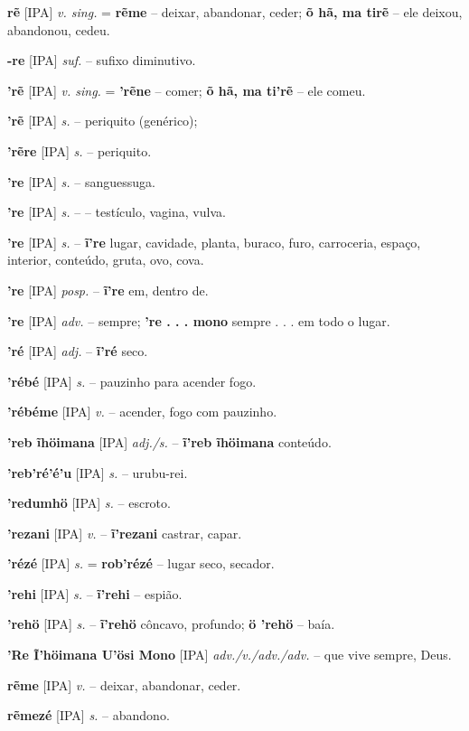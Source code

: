 \textbf{rẽ} [IPA] \textit{v. sing.} = \textbf{rẽme} -- deixar, abandonar, ceder; \textbf{õ hã, ma tirẽ} -- ele deixou, abandonou, cedeu.

\textbf{-re} [IPA] \textit{suf.} -- sufixo diminutivo.

\textbf{'rẽ} [IPA] \textit{v. sing.} = \textbf{'rẽne} -- comer; \textbf{õ hã, ma ti'rẽ} -- ele comeu.

\textbf{'rẽ} [IPA] \textit{s.} -- periquito (genérico); 

\textbf{'rẽre} [IPA] \textit{s.} -- periquito.

\textbf{'re} [IPA] \textit{s.} -- sanguessuga.

\textbf{'re} [IPA] \textit{s.} -- -- testículo, vagina, vulva.

\textbf{'re} [IPA] \textit{s.} -- \textbf{ĩ're} lugar, cavidade, planta, buraco, furo, carroceria, espaço, interior, conteúdo, gruta, ovo, cova.

\textbf{'re} [IPA] \textit{ posp.} -- \textbf{ĩ're} em, dentro de.

\textbf{'re} [IPA] \textit{adv.} -- sempre; \textbf{'re . . . mono} sempre . . . em todo o lugar.

\textbf{'ré} [IPA] \textit{adj.} -- \textbf{ĩ'ré} seco.

\textbf{'rébé} [IPA] \textit{s.} -- pauzinho para acender fogo.

\textbf{'rébéme} [IPA] \textit{v.} -- acender, fogo com pauzinho.

\textbf{'reb ĩhöimana} [IPA] \textit{adj./s.} -- \textbf{ĩ'reb ĩhöimana} conteúdo.

\textbf{'reb'ré'é'u} [IPA] \textit{s.} -- urubu-rei.

\textbf{'redumhö} [IPA] \textit{s.} -- escroto.

\textbf{'rezani} [IPA] \textit{v.} -- \textbf{ĩ'rezani} castrar, capar.

\textbf{'rézé} [IPA] \textit{s.} = \textbf{rob'rézé} -- lugar seco, secador.

\textbf{'rehi} [IPA] \textit{s.} -- \textbf{ĩ'rehi} -- espião.

\textbf{'rehö} [IPA] \textit{s.} -- \textbf{ĩ'rehö} côncavo, profundo; \textbf{ö 'rehö} -- baía.

\textbf{'Re Ĩ'höimana U'ösi Mono} [IPA] \textit{adv./v./adv./adv.} -- que vive sempre, Deus.

\textbf{rẽme} [IPA] \textit{v.} -- deixar, abandonar, ceder.

\textbf{rẽmezé} [IPA] \textit{s.} -- abandono.


